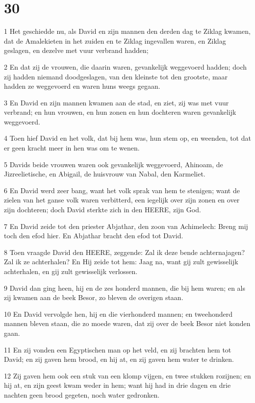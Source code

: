\chapter{30}

\par 1 Het geschiedde nu, als David en zijn mannen den derden dag te Ziklag kwamen, dat de Amalekieten in het zuiden en te Ziklag ingevallen waren, en Ziklag geslagen, en dezelve met vuur verbrand hadden;
\par 2 En dat zij de vrouwen, die daarin waren, gevankelijk weggevoerd hadden; doch zij hadden niemand doodgeslagen, van den kleinste tot den grootste, maar hadden ze weggevoerd en waren huns weegs gegaan.
\par 3 En David en zijn mannen kwamen aan de stad, en ziet, zij was met vuur verbrand; en hun vrouwen, en hun zonen en hun dochteren waren gevankelijk weggevoerd.
\par 4 Toen hief David en het volk, dat bij hem was, hun stem op, en weenden, tot dat er geen kracht meer in hen was om te wenen.
\par 5 Davids beide vrouwen waren ook gevankelijk weggevoerd, Ahinoam, de Jizreelietische, en Abigail, de huisvrouw van Nabal, den Karmeliet.
\par 6 En David werd zeer bang, want het volk sprak van hem te stenigen; want de zielen van het ganse volk waren verbitterd, een iegelijk over zijn zonen en over zijn dochteren; doch David sterkte zich in den HEERE, zijn God.
\par 7 En David zeide tot den priester Abjathar, den zoon van Achimelech: Breng mij toch den efod hier. En Abjathar bracht den efod tot David.
\par 8 Toen vraagde David den HEERE, zeggende: Zal ik deze bende achternajagen? Zal ik ze achterhalen? En Hij zeide tot hem: Jaag na, want gij zult gewisselijk achterhalen, en gij zult gewisselijk verlossen.
\par 9 David dan ging heen, hij en de zes honderd mannen, die bij hem waren; en als zij kwamen aan de beek Besor, zo bleven de overigen staan.
\par 10 En David vervolgde hen, hij en die vierhonderd mannen; en tweehonderd mannen bleven staan, die zo moede waren, dat zij over de beek Besor niet konden gaan.
\par 11 En zij vonden een Egyptischen man op het veld, en zij brachten hem tot David; en zij gaven hem brood, en hij at, en zij gaven hem water te drinken.
\par 12 Zij gaven hem ook een stuk van een klomp vijgen, en twee stukken rozijnen; en hij at, en zijn geest kwam weder in hem; want hij had in drie dagen en drie nachten geen brood gegeten, noch water gedronken.
